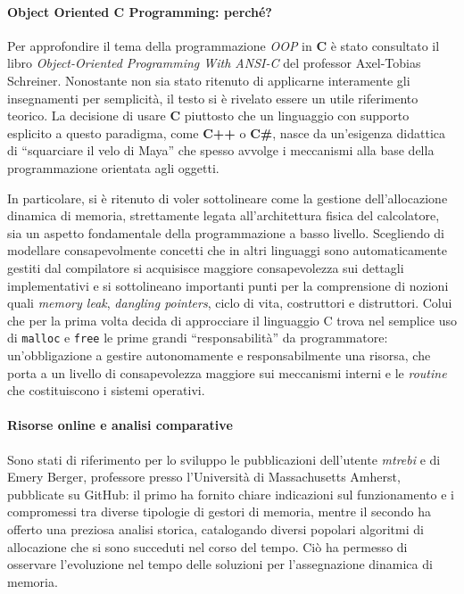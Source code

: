 \paragraph{Object Oriented C Programming: perché?}

Per approfondire il tema della programmazione \textit{OOP} in \textbf{C} è stato consultato il libro \textit{Object-Oriented Programming With ANSI-C} del professor Axel-Tobias Schreiner\cite{schreiner1994}. Nonostante non sia stato ritenuto di applicarne interamente gli insegnamenti per semplicità, il testo si è rivelato essere un utile riferimento teorico. La decisione di usare \textbf{C} piuttosto che un linguaggio con supporto esplicito a questo paradigma, come \textbf{C++} o \textbf{C\#}, nasce da un’esigenza didattica di ``squarciare il velo di Maya'' che spesso avvolge i meccanismi alla base della programmazione orientata agli oggetti.

In particolare, si è ritenuto di voler sottolineare come la gestione dell’allocazione dinamica di memoria, strettamente legata all’architettura fisica del calcolatore, sia un aspetto fondamentale della programmazione a basso livello. Scegliendo di modellare consapevolmente concetti che in altri linguaggi sono automaticamente gestiti dal compilatore si acquisisce maggiore consapevolezza sui dettagli implementativi e si sottolineano importanti punti per la comprensione di nozioni quali \textit{memory leak}, \textit{dangling pointers}, ciclo di vita, costruttori e distruttori. Colui che per la prima volta decida di approcciare il linguaggio C trova nel semplice uso di \texttt{malloc} e \texttt{free} le prime grandi ``responsabilità'' da programmatore: un’obbligazione a gestire autonomamente e responsabilmente una risorsa, che porta a un livello di consapevolezza maggiore sui meccanismi interni e le \textit{routine} che costituiscono i sistemi operativi. 

\paragraph{Risorse online e analisi comparative}

Sono stati di riferimento per lo sviluppo le pubblicazioni dell’utente \textit{mtrebi}\cite{mtrebi} e di Emery Berger, professore presso l’Università di Massachusetts Amherst\cite{emeryberger}, pubblicate su GitHub: il primo ha fornito chiare indicazioni sul funzionamento e i compromessi tra diverse tipologie di gestori di memoria, mentre il secondo ha offerto una preziosa analisi storica, catalogando diversi popolari algoritmi di allocazione che si sono succeduti nel corso del tempo. Ciò ha permesso di osservare l’evoluzione nel tempo delle soluzioni per l'assegnazione dinamica di memoria.

